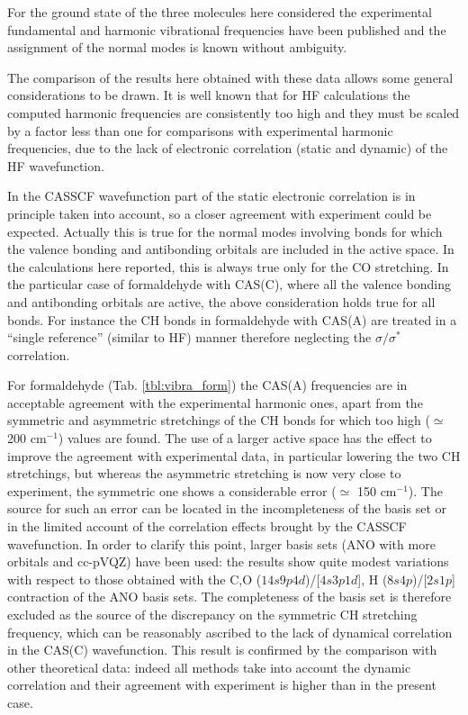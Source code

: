For the ground state of the three molecules here considered the experimental
fundamental and harmonic vibrational frequencies have been published and the
assignment of the normal modes is known without ambiguity. 

The comparison of the results here obtained with these data allows some
general considerations to be drawn.  It is well known that for HF
calculations the computed harmonic frequencies are consistently too high and
they must be scaled by a factor less than one for comparisons with
experimental harmonic frequencies, due to the lack of electronic correlation
(static and dynamic) of the HF wavefunction. 

In the CASSCF wavefunction part of the static electronic correlation is in
principle taken into account, so a closer agreement with experiment could be
expected.  Actually this is true for the normal modes involving bonds for
which the valence bonding and antibonding orbitals are included in the
active space. In the calculations here reported, this is always true only
for the CO stretching. In the particular case of formaldehyde with CAS(C),
where all the valence bonding and antibonding orbitals are active, the above
consideration holds true for all bonds. For instance the CH bonds in
formaldehyde with CAS(A) are treated in a ``single reference'' (similar to
HF) manner therefore neglecting the $\sigma/\sigma^*$ correlation.



For formaldehyde (Tab. \ref{tbl:vibra_form}) the CAS(A) frequencies are in
acceptable agreement with the experimental harmonic ones, apart from
the symmetric and asymmetric stretchings of the CH bonds for which too high
($\simeq$ 200 cm$^{-1}$) values are found.  The use of a larger active space
has the effect to improve the agreement with experimental data, in
particular lowering the two CH stretchings, but whereas the asymmetric
stretching is now very close to experiment, the symmetric one shows a
considerable error ($\simeq$ 150 cm$^{-1}$). The source for such an error
can be located in the incompleteness of the basis set or in the limited
account of the correlation effects brought by the CASSCF wavefunction.  In
order to clarify this point, larger basis sets (ANO with more orbitals and
cc-pVQZ) have been used: the results show quite modest variations with
respect to those obtained with the C,O ($14s9p4d$)/[$4s3p1d$], H
($8s4p$)/[$2s1p$] contraction of the ANO basis sets. The completeness of the
basis set is therefore excluded as the source of the discrepancy on the
symmetric CH stretching frequency, which can be reasonably ascribed to the
lack of dynamical correlation in the CAS(C) wavefunction.  This result is
confirmed by the comparison with other theoretical data: indeed all methods
take into account the dynamic correlation and their agreement with
experiment is higher than in the present case.

